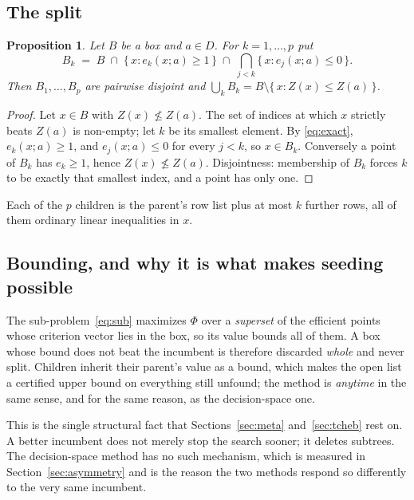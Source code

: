 \documentclass[11pt,a4paper]{article}
\newtheorem{proposition}{Proposition}
\newcommand{\Z}{Z}
\newcommand{\Dset}{D}
\begin{document}
\subsection{The split}

\begin{proposition}\label{prop:split}
Let $B$ be a box and $a \in \Dset$. For $k = 1,\dots,p$ put
\begin{equation}\label{eq:child}
  B_k \;=\; B \;\cap\; \{\, x : e_k(x;a) \geqslant 1 \,\}
            \;\cap\; \bigcap_{j<k} \{\, x : e_j(x;a) \leqslant 0 \,\} .
\end{equation}
Then $B_1,\dots,B_p$ are pairwise disjoint and
$\bigcup_k B_k = B \setminus \{\, x : \Z(x) \leqslant \Z(a) \,\}$.
\end{proposition}

\begin{proof}
Let $x \in B$ with $\Z(x) \not\leqslant \Z(a)$. The set of indices at which $x$
strictly beats $\Z(a)$ is non-empty; let $k$ be its smallest element. By
\eqref{eq:exact}, $e_k(x;a) \geqslant 1$, and $e_j(x;a) \leqslant 0$ for every
$j < k$, so $x \in B_k$. Conversely a point of $B_k$ has
$e_k \geqslant 1$, hence $\Z(x) \not\leqslant \Z(a)$. Disjointness: membership
of $B_k$ forces $k$ to be exactly that smallest index, and a point has only
one.
\end{proof}

\noindent
Each of the $p$ children is the parent's row list plus at most $k$ further
rows, all of them ordinary linear inequalities in $x$.

\subsection{Bounding, and why it is what makes seeding possible}
\label{sec:bound}

The sub-problem~\eqref{eq:sub} maximizes $\Phi$ over a \emph{superset} of the
efficient points whose criterion vector lies in the box, so its value bounds
all of them. A box whose bound does not beat the incumbent is therefore
discarded \emph{whole} and never split. Children inherit their parent's value
as a bound, which makes the open list a certified upper bound on everything
still unfound; the method is \emph{anytime} in the same sense, and for the same
reason, as the decision-space one.

This is the single structural fact that Sections~\ref{sec:meta}
and~\ref{sec:tcheb} rest on. A better incumbent does not merely stop the search
sooner; it deletes subtrees. The decision-space method has no such mechanism,
which is measured in Section~\ref{sec:asymmetry} and is the reason the two
methods respond so differently to the very same incumbent.
\end{document}
